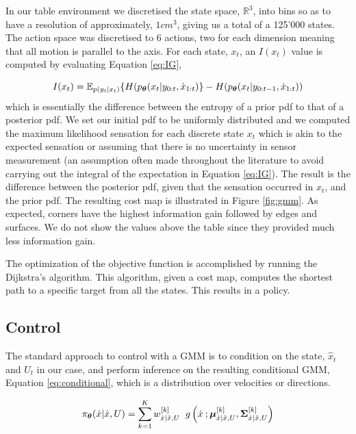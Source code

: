 In our table environment we discretised the state space, $\mathbb{R}^3$, into bins so as to have a resolution of approximately, $1 cm^3$, giving us a total of a 125'000
states. The action space was discretised to 6 actions, two for each dimension meaning that all motion is parallel to the axis. For each state, $x_t$, an $I(x_t)$ value is
computed by evaluating Equation \ref{eq:IG},


\begin{equation}\label{eq:IG}
 I(x_t) = \mathbb{E}_{p(y_t|x_t)}\{ H(p_{\boldsymbol{\theta}}(x_t|y_{0:t},\dot{x}_{1:t}) \} - H(p_{\boldsymbol{\theta}}(x_t|y_{0:t-1},\dot{x}_{1:t}))
\end{equation}
which is essentially the difference between the entropy of a prior pdf to that of a posterior pdf.
We set our initial pdf to be uniformly distributed and  we computed the maximum likelihood sensation for each discrete state $x_t$
which is akin to the expected sensation or assuming that there is no uncertainty in sensor measurement (an assumption 
often made throughout the literature to avoid carrying out the integral of the expectation in Equation \ref{eq:IG}).
The result is the difference between the posterior pdf, given that the sensation occurred in $x_t$, and the prior pdf. The resulting cost
map is illustrated in Figure \ref{fig:gmm}. As expected, corners have the highest information gain followed by edges and surfaces. 
We do not show the values above the table since they provided much less information gain.

The optimization of the objective function is accomplished by running the Dijkstra's algorithm. This algorithm, given a cost map, 
computes the shortest path to a specific target from all the states. This results in a policy.

\subsection{Control}
The standard approach to control with a GMM is to condition on the state,
$\hat{x}_t$ and $U_t$ in our case, and perform inference on the resulting conditional
GMM, Equation \ref{eq:conditional}, which is a distribution over velocities or directions.

\begin{equation} \label{eq:conditional}
  \pi_{\boldsymbol{\theta}}(\dot{x}|\hat{x},U) = \sum\limits_{k=1}^{K} w^{[k]}_{\dot{x}|\hat{x},U} \;\;  g\left(\dot{x}\: ;  \boldsymbol{\mu}^{[k]}_{\dot{x}|\hat{x},U}, \boldsymbol{\Sigma}^{[k]}_{\dot{x}|\hat{x},U} \right)
\end{equation}

